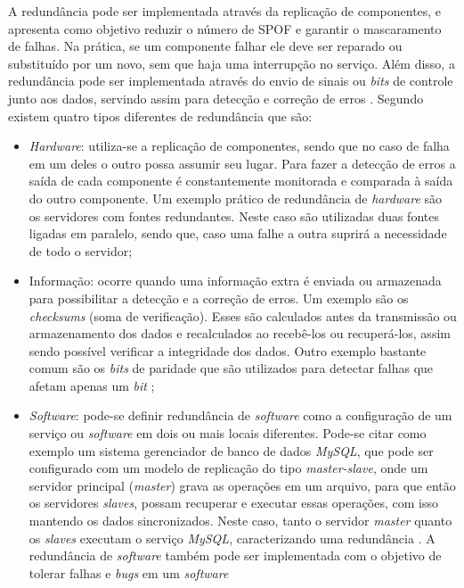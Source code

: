A redundância pode ser implementada através da replicação de componentes, e apresenta como objetivo reduzir o número de \ac{SPOF} e garantir 
o mascaramento de falhas. Na prática, se um componente falhar ele deve ser reparado ou substituído por um novo, sem que haja uma 
interrupção no serviço. Além disso, a redundância pode ser implementada através do envio de sinais ou \textit{bits} de controle junto aos dados, 
servindo assim para detecção e correção de erros \cite{weber2002}. Segundo \cite{norvag2000} existem quatro tipos diferentes 
de redundância que são:
\begin{itemize}
 \item \textit{Hardware}: utiliza-se a replicação de componentes, sendo que no caso de falha em um deles o outro possa assumir seu lugar. 
 Para fazer a detecção de erros a saída de cada componente é constantemente monitorada e comparada à saída do outro componente.
 Um exemplo prático de redundância de \textit{hardware} são os servidores com fontes redundantes. Neste caso são utilizadas duas fontes 
 ligadas em paralelo, sendo que, caso uma falhe a outra suprirá a necessidade de todo o servidor;
 \item Informação: ocorre quando uma informação extra é enviada ou armazenada para possibilitar a detecção e a correção de erros.
 Um exemplo são os \textit{checksums} (soma de verificação). Esses são calculados antes da transmissão ou armazenamento dos dados 
 e recalculados ao recebê-los ou recuperá-los, assim sendo possível verificar a integridade dos dados. Outro exemplo bastante comum são os 
 \textit{bits} de paridade que são utilizados para detectar falhas que afetam apenas um \textit{bit} \cite{weber2002};
 \item \textit{Software}: pode-se definir redundância de \textit{software} como a configuração de um serviço ou \textit{software} em
 dois ou mais locais diferentes. Pode-se citar como exemplo um sistema gerenciador de banco de dados \textit{MySQL}, que pode ser configurado 
 com um modelo de replicação do tipo \textit{master-slave}, onde um servidor principal (\textit{master}) grava as operações em um arquivo, 
 para que então os servidores \textit{slaves}, possam recuperar e executar essas operações, com isso mantendo os dados sincronizados. Neste caso, 
 tanto o servidor \textit{master} quanto os \textit{slaves} executam o serviço \textit{MySQL}, caracterizando uma redundância \cite{viana201}. 
 A redundância de \textit{software} também pode ser implementada com o objetivo de tolerar falhas e \textit{bugs} em um \textit{software} 

\end{itemize}
